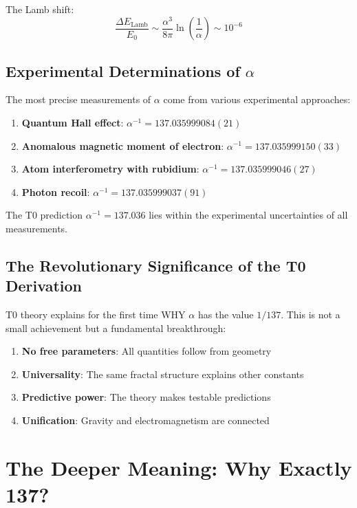 \documentclass[12pt,a4paper]{article}
\theoremstyle{definition}
\begin{document}
	The Lamb shift:
	\begin{equation}
		\frac{\Delta E_{\text{Lamb}}}{E_0} \sim \frac{\alpha^3}{8\pi} \ln\left(\frac{1}{\alpha}\right) \sim 10^{-6}
	\end{equation}
	
	\subsection{Experimental Determinations of $\alpha$}
	
	The most precise measurements of $\alpha$ come from various experimental approaches:
	
	\begin{enumerate}
		\item \textbf{Quantum Hall effect}: $\alpha^{-1} = 137.035999084(21)$
		\item \textbf{Anomalous magnetic moment of electron}: $\alpha^{-1} = 137.035999150(33)$
		\item \textbf{Atom interferometry with rubidium}: $\alpha^{-1} = 137.035999046(27)$
		\item \textbf{Photon recoil}: $\alpha^{-1} = 137.035999037(91)$
	\end{enumerate}
	
	The T0 prediction $\alpha^{-1} = 137.036$ lies within the experimental uncertainties of all measurements.
	
	\subsection{The Revolutionary Significance of the T0 Derivation}
	
	T0 theory explains for the first time WHY $\alpha$ has the value $1/137$. This is not a small achievement but a fundamental breakthrough:
	
	\begin{enumerate}
		\item \textbf{No free parameters}: All quantities follow from geometry
		\item \textbf{Universality}: The same fractal structure explains other constants
		\item \textbf{Predictive power}: The theory makes testable predictions
		\item \textbf{Unification}: Gravity and electromagnetism are connected
	\end{enumerate}
	
	\section{The Deeper Meaning: Why Exactly 137?}
	
\end{document}

